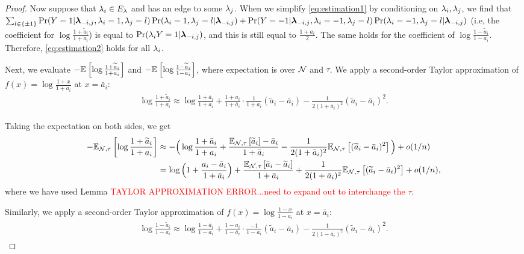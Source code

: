 \begin{proof}
Now suppose that $\lambda_i \in E_{\lambda}$ and has an edge to some $\lambda_j$. When we simplify \eqref{eq:estimation1} by conditioning on $\lambda_i, \lambda_j$, we find that $\sum_{l \in \{\pm 1\}}\Pr(Y = 1 | \bm{\lambda}_{-i, j}, \lambda_i = 1, \lambda_j = l) \Pr(\lambda_i = 1, \lambda_j = l | \bm{\lambda}_{-i, j}) + \Pr(Y = -1 | \bm{\lambda}_{-i, j}, \lambda_i = -1, \lambda_j = l) \Pr(\lambda_i = -1, \lambda_j = l | \bm{\lambda}_{-i, j} )$ (i.e, the coefficient for $\log \frac{1 + \widetilde{a}_i}{1 + a_i}$) is equal to $\Pr(\lambda_i Y = 1 | \bm{\lambda}_{-i, j})$, and this is still equal to $\frac{1 + a_i}{2}$. The same holds for the coefficient of $\log \frac{1 - \widetilde{a}_i}{1 - a_i}$. Therefore, \eqref{eq:estimation2} holds for all $\lambda_i$.

Next, we evaluate $-\mathbb{E}_{}\left[\log \frac{1 + \widetilde{a}_i}{1 + a_i}\right]$ and $-\mathbb{E}_{}\left[\log \frac{1 - \widetilde{a}_i}{1 - a_i}\right]$, where expectation is over $\mathcal{N}$ and $\tau$. We apply a second-order Taylor approximation of $f(x) = \log \frac{1 + x}{1 + a_i}$ at $x = \bar{a}_i$:
\begin{align*}
\log \frac{1 + \widetilde{a}_i}{1 + a_i} \approx \log \frac{1 + \bar{a}_i}{1 + a_i} + \frac{1 + a_i}{1 + \bar{a}_i} \cdot \frac{1}{1 + a_i} (\widetilde{a}_i - \bar{a}_i) - \frac{1}{2(1 + \bar{a}_i)^2} (\widetilde{a}_i - \bar{a}_i)^2.
\end{align*}


Taking the expectation on both sides, we get 
\begin{align*}
-\mathbb{E}_{\mathcal{N}, \tau}\left[\log \frac{1 + \widetilde{a}_i}{1 + a_i}\right] &\approx -\Big(\log \frac{1 + \bar{a}_i}{1 + a_i} + \frac{\mathbb{E}_{\mathcal{N}, \tau}\left[\widetilde{a}_i\right] - \bar{a}_i}{1 + \bar{a}_i} - \frac{1}{2(1 + \bar{a}_i)^2} \mathbb{E}_{\mathcal{N}, \tau}\left[(\widetilde{a}_i - \bar{a}_i)^2\right]\Big) + o(1/n) \\
&= \log \Big(1 + \frac{a_i - \bar{a}_i}{1 + \bar{a}_i} \Big) + \frac{\mathbb{E}_{\mathcal{N}, \tau}\left[\bar{a}_i - \widetilde{a}_i\right]}{1 + \bar{a}_i} + \frac{1}{2(1 + \bar{a}_i)^2} \mathbb{E}_{\mathcal{N}, \tau}\left[(\widetilde{a}_i - \bar{a}_i)^2\right] + o(1/n),
\end{align*}
where we have used Lemma \textcolor{red}{TAYLOR APPROXIMATION ERROR...need to expand out to interchange the $\tau$}. 

Similarly, we apply a second-order Taylor approximation of $f(x) = \log \frac{1 - x}{1 - a_i}$ at $x = \bar{a}_i$:
\begin{align*}
\log \frac{1 - \widetilde{a}_i}{1 - a_i} \approx \log \frac{1 - \bar{a}_i}{1 - a_i} + \frac{1 - a_i}{1 - \bar{a}_i} \cdot \frac{-1}{1 - a_i} (\widetilde{a}_i - \bar{a}_i) - \frac{1}{2(1 - \bar{a}_i)^2} (\widetilde{a}_i - \bar{a}_i)^2.
\end{align*}


\end{proof}
